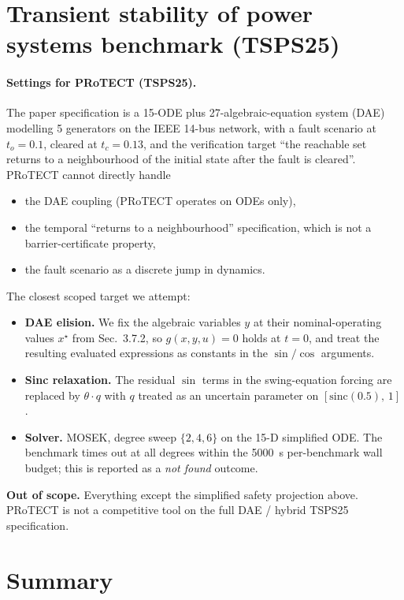 \documentclass[11pt,a4paper]{article}
\newcommand{\settings}[1]{\paragraph{Settings for PRoTECT (#1).}}
\begin{document}
\section{Transient stability of power systems benchmark (TSPS25)}

\settings{TSPS25}
The paper specification is a 15-ODE plus 27-algebraic-equation system
(DAE) modelling 5 generators on the IEEE 14-bus network, with a fault
scenario at $t_o = 0.1$, cleared at $t_c = 0.13$, and the verification
target ``the reachable set returns to a neighbourhood of the initial
state after the fault is cleared''. PRoTECT cannot directly handle
\begin{itemize}
  \item the DAE coupling (PRoTECT operates on ODEs only),
  \item the temporal ``returns to a neighbourhood'' specification,
        which is not a barrier-certificate property,
  \item the fault scenario as a discrete jump in dynamics.
\end{itemize}

\noindent The closest scoped target we attempt:
\begin{itemize}
  \item \textbf{DAE elision.} We fix the algebraic variables $y$ at
        their nominal-operating values $x^{\star}$ from Sec.~3.7.2, so
        $g(x, y, u) = 0$ holds at $t = 0$, and treat the resulting
        evaluated expressions as constants in the $\sin / \cos$
        arguments.
  \item \textbf{Sinc relaxation.} The residual $\sin$ terms in the
        swing-equation forcing are replaced by $\theta \cdot q$ with
        $q$ treated as an uncertain parameter on
        $[\mathrm{sinc}(0.5),\, 1]$.
  \item \textbf{Solver.} MOSEK, degree sweep $\{2, 4, 6\}$ on the
        15-D simplified ODE. The benchmark times out at all degrees
        within the 5000~s per-benchmark wall budget; this is reported
        as a \emph{not found} outcome.
\end{itemize}
\textbf{Out of scope.} Everything except the simplified safety
projection above. PRoTECT is not a competitive tool on the full
DAE / hybrid TSPS25 specification.

\section*{Summary}
\end{document}
